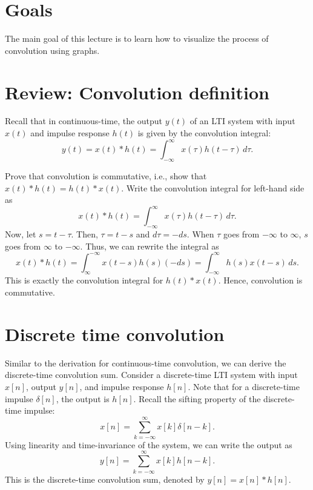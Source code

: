 ﻿
\section{Goals}
The main goal of this lecture is to learn how to visualize the process of convolution using graphs. 

\section{Review: Convolution definition}
Recall that in continuous-time, the output $y(t)$ of an LTI system with input $x(t)$ and impulse response $h(t)$ is given by the convolution integral:
\[
y(t) = x(t) * h(t) = \int_{-\infty}^{\infty} x(\tau) h(t - \tau) \, d\tau.
\]
\begin{popquiz}
Prove that convolution is commutative, i.e., show that $x(t) * h(t) = h(t) * x(t)$.
\popqsplit 
Write the convolution integral for left-hand side as 
\[
x(t) * h(t) = \int_{-\infty}^{\infty} x(\tau) h(t - \tau) \, d\tau.
\]
Now, let $s = t - \tau$. Then, $\tau = t - s$ and $d\tau = -ds$. When $\tau$ goes from $-\infty$ to $\infty$, $s$ goes from $\infty$ to $-\infty$. Thus, we can rewrite the integral as
\[
x(t) * h(t) = \int_{\infty}^{-\infty} x(t - s) h(s) (-ds) = \int_{-\infty}^{\infty} h(s) x(t - s) \, ds.
\]
This is exactly the convolution integral for $h(t) * x(t)$. Hence, convolution is commutative.
\end{popquiz}
\section{Discrete time convolution}
Similar to the derivation for continuous-time convolution, we can derive the discrete-time convolution sum. Consider a discrete-time LTI system with input $x[n]$, output $y[n]$, and impulse response $h[n]$. Note that for a discrete-time impulse $\delta[n]$, the output is $h[n]$. Recall the sifting property of the discrete-time impulse:
\[
x[n] = \sum_{k=-\infty}^{\infty} x[k] \delta[n - k].
\]
Using linearity and time-invariance of the system, we can write the output as
\[
y[n] = \sum_{k=-\infty}^{\infty} x[k] h[n - k].
\]
This is the discrete-time convolution sum, denoted by $y[n] = x[n] * h[n]$.

